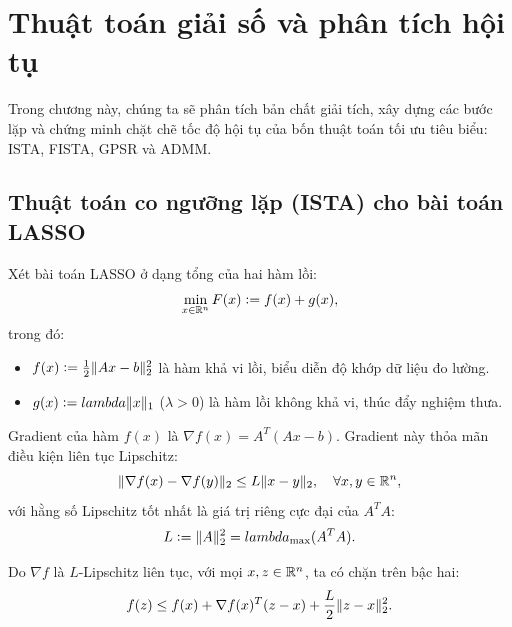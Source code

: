 \chapter{Thuật toán giải số và phân tích hội tụ}
\label{chap:thuat_toan}

Trong chương này, chúng ta sẽ phân tích bản chất giải tích, xây dựng các bước lặp và chứng minh chặt chẽ tốc độ hội tụ của bốn thuật toán tối ưu tiêu biểu: ISTA, FISTA, GPSR và ADMM.

\section{Thuật toán co ngưỡng lặp (ISTA) cho bài toán LASSO}
Xét bài toán LASSO ở dạng tổng của hai hàm lồi:
\begin{equation}
    \min_{x \in \mathbb{R}^n} F(x) \mathrel{\mathop:}= f(x) + g(x),
\end{equation}
trong đó:
\begin{itemize}
    \item $f(x) \mathrel{\mathop:}= \frac{1}{2} \|Ax - b\|_2^2$ là hàm khả vi lồi, biểu diễn độ khớp dữ liệu đo lường.
    \item $g(x) \mathrel{\mathop:}= lambda \|x\|_1$ ($\lambda > 0$) là hàm lồi không khả vi, thúc đẩy nghiệm thưa.
\end{itemize}

Gradient của hàm $f(x)$ là $\nabla f(x) = A^T(Ax - b)$. Gradient này thỏa mãn điều kiện liên tục Lipschitz:
\begin{equation}
    \|\nabla f(x) - \nabla f(y)\|_2 \le L \|x - y\|_2, \quad \forall x, y \in \mathbb{R}^n,
\end{equation}
với hằng số Lipschitz tốt nhất là giá trị riêng cực đại của $A^T A$:
\begin{equation}
    L \mathrel{\mathop:}= \|A\|_2^2 = lambda_{\max}(A^T A).
\end{equation}

\begin{lemma}
Do $\nabla f$ là $L$-Lipschitz liên tục, với mọi $x, z \in \mathbb{R}^n$, ta có chặn trên bậc hai:
\begin{equation}
    f(z) \le f(x) + \nabla f(x)^T(z - x) + \frac{L}{2} \|z - x\|_2^2.
    \label{eq:descent_lemma}
\end{equation}
\end{lemma}

